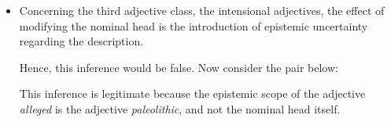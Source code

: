 \documentclass[10pt]{article}
\begin{document}
\begin{itemize}
 
\item Concerning the third adjective class, the intensional adjectives, the effect of modifying the nominal head is the introduction of epistemic uncertainty regarding the description. 


\noindent Hence, this inference would  be false. Now  consider the pair below:


\noindent This inference is legitimate because the epistemic scope of the adjective {\it alleged} is the adjective {\it paleolithic}, and not the nominal head itself. 
\end{itemize}
\end{document}
